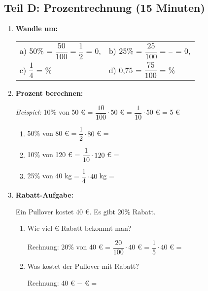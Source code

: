 \subsection*{Teil D: Prozentrechnung (15 Minuten)}

\begin{enumerate}[resume, label=\arabic*.]
    \item \textbf{Wandle um:}

    \begin{tabular}{ll}
        a) 50\% = $\dfrac{50}{100} = \dfrac{1}{2}$ = 0,\underline{\hspace{1cm}} & 
        b) 25\% = $\dfrac{25}{100} = \dfrac{\phantom{1}}{\phantom{4}}$ = 0,\underline{\hspace{1cm}} \\[3ex]
        c) $\dfrac{1}{4}$ = \underline{\hspace{2cm}}\% & 
        d) 0,75 = $\dfrac{75}{100}$ = \underline{\hspace{2cm}}\%
    \end{tabular}

    \vspace{1cm}

    \item \textbf{Prozent berechnen:}

    \textit{Beispiel:} 10\% von 50 € = $\dfrac{10}{100} \cdot 50$ € = $\dfrac{1}{10} \cdot 50$ € = 5 €

    \begin{enumerate}[label=\alph*)]
        \item 50\% von 80 € = $\dfrac{1}{2} \cdot 80$ € = \underline{\hspace{3cm}}
        \item 10\% von 120 € = $\dfrac{1}{10} \cdot 120$ € = \underline{\hspace{3cm}}
        \item 25\% von 40 kg = $\dfrac{1}{4} \cdot 40$ kg = \underline{\hspace{3cm}}
    \end{enumerate}

    \vspace{0.5cm}

    \item \textbf{Rabatt-Aufgabe:}

    Ein Pullover kostet 40 €. Es gibt 20\% Rabatt.

    \begin{enumerate}[label=\alph*)]
        \item Wie viel € Rabatt bekommt man? 

        Rechnung: 20\% von 40 € = $\dfrac{20}{100} \cdot 40$ € = $\dfrac{1}{5} \cdot 40$ € = \underline{\hspace{3cm}}

        \item Was kostet der Pullover mit Rabatt? 

        Rechnung: 40 € $-$ \underline{\hspace{2cm}} € = \underline{\hspace{3cm}}
    \end{enumerate}
\end{enumerate}